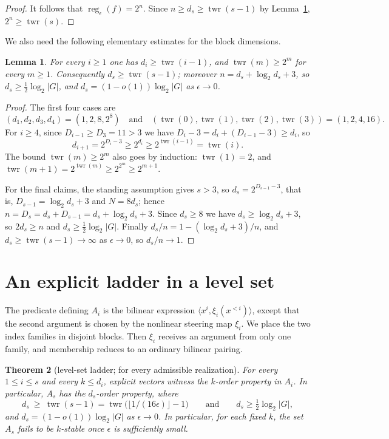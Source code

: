 \documentclass[10pt,a4paper]{amsart}
\newtheorem{theorem}{Theorem}
\newtheorem{lemma}[theorem]{Lemma}
\numberwithin{theorem}{section}
\newcommand{\inner}[2]{\langle #1,#2\rangle}
\newcommand{\abs}[1]{\lvert #1\rvert}
\newcommand{\half}{\tfrac12}
\newcommand{\twr}{\operatorname{twr}}
\newcommand{\reg}{\operatorname{reg}}
\begin{document}
\begin{proof}
It follows that $\reg_\epsilon(f)=2^n$. Since
$n\ge d_s\ge\twr(s-1)$ by Lemma~\ref{lem:blockgrowth},
$2^n\ge\twr(s)$.
\end{proof}

We also need the following elementary estimates for the block dimensions.

\begin{lemma}\label{lem:blockgrowth}
For every $i\ge1$ one has $d_i\ge\twr(i-1)$, and $\twr(m)\ge2^{m}$ for every
$m\ge1$. Consequently $d_s\ge\twr(s-1)$; moreover $n=d_s+\log_2 d_s+3$, so
$d_s\ge\half\log_2\abs{G}$, and $d_s=(1-o(1))\log_2\abs{G}$ as $\epsilon\to0$.
\end{lemma}

\begin{proof}
The first four cases are
\[
  (d_1,d_2,d_3,d_4)=(1,2,8,2^8)
  \quad\text{and}\quad
  (\twr(0),\twr(1),\twr(2),\twr(3))=(1,2,4,16).
\]
For $i\ge4$, since $D_{i-1}\ge D_3=11>3$
we have $D_i-3=d_i+(D_{i-1}-3)\ge d_i$, so
\[
  d_{i+1}=2^{D_i-3}\ge 2^{d_i}\ge 2^{\twr(i-1)}=\twr(i).
\]
The bound $\twr(m)\ge2^m$ also goes by induction: $\twr(1)=2$, and
$\twr(m+1)=2^{\twr(m)}\ge2^{2^m}\ge2^{m+1}$.

For the final claims, the standing assumption gives $s>3$, so
$d_s=2^{D_{s-1}-3}$, that is, $D_{s-1}=\log_2 d_s+3$ and $N=8d_s$; hence
$n=D_s=d_s+D_{s-1}=d_s+\log_2 d_s+3$. Since $d_s\ge 8$ we have
$d_s\ge\log_2 d_s+3$, so $2d_s\ge n$ and $d_s\ge\half\log_2\abs{G}$. Finally
$d_s/n=1-(\log_2 d_s+3)/n$, and $d_s\ge\twr(s-1)\to\infty$ as $\epsilon\to0$,
so $d_s/n\to1$.
\end{proof}



\section{An explicit ladder in a level set}\label{sec:levelset}

The predicate defining $A_i$ is the bilinear expression
$\inner{x^i}{\xi_i(x^{<i})}$, except that the second argument is chosen by the
nonlinear steering map $\xi_i$. We place the two index families in disjoint
blocks. Then $\xi_i$ receives an argument from only one family, and membership
reduces to an ordinary bilinear pairing.

\begin{theorem}[level-set ladder; for every admissible realization]\label{thm:levelset}
For every $1\le i\le s$ and every $k\le d_i$, explicit vectors witness
the $k$-order property in $A_i$. In particular, $A_s$ has the $d_s$-order
property, where
\[
  d_s\ \ge\ \twr(s-1)=\twr\bigl(\lfloor 1/(16\epsilon)\rfloor-1\bigr)
  \qquad\text{and}\qquad d_s\ge\half\log_2\abs{G},
\]
and $d_s=(1-o(1))\log_2\abs{G}$ as $\epsilon\to0$.  In particular, for each
fixed $k$, the set $A_s$ fails to be $k$-stable once $\epsilon$ is
sufficiently small.
\end{theorem}
\end{document}
